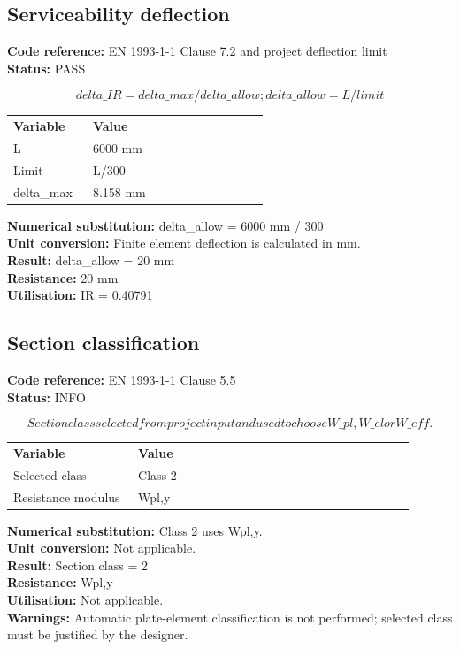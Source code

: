 \documentclass[11pt,a4paper]{article}
\begin{document}
\subsection{Serviceability deflection}
\textbf{Code reference:} EN 1993-1-1 Clause 7.2 and project deflection limit\\
\textbf{Status:} PASS

\[
delta\_IR = delta\_max / delta\_allow; delta\_allow = L / limit
\]

\begin{longtable}{p{0.28\linewidth}p{0.62\linewidth}}
\textbf{Variable} & \textbf{Value} \\
L & 6000 mm \\
Limit & L/300 \\
delta\_max & 8.158 mm \\
\end{longtable}

\textbf{Numerical substitution:} delta\_allow = 6000 mm / 300\\
\textbf{Unit conversion:} Finite element deflection is calculated in mm.\\
\textbf{Result:} delta\_allow = 20 mm\\
\textbf{Resistance:} 20 mm\\
\textbf{Utilisation:} IR = 0.40791\\


\subsection{Section classification}
\textbf{Code reference:} EN 1993-1-1 Clause 5.5\\
\textbf{Status:} INFO

\[
Section class selected from project input and used to choose W\_pl, W\_el or W\_eff.
\]

\begin{longtable}{p{0.28\linewidth}p{0.62\linewidth}}
\textbf{Variable} & \textbf{Value} \\
Selected class & Class 2 \\
Resistance modulus & Wpl,y \\
\end{longtable}

\textbf{Numerical substitution:} Class 2 uses Wpl,y.\\
\textbf{Unit conversion:} Not applicable.\\
\textbf{Result:} Section class = 2\\
\textbf{Resistance:} Wpl,y\\
\textbf{Utilisation:} Not applicable.\\
\textbf{Warnings:} Automatic plate-element classification is not performed; selected class must be justified by the designer.
\end{document}
